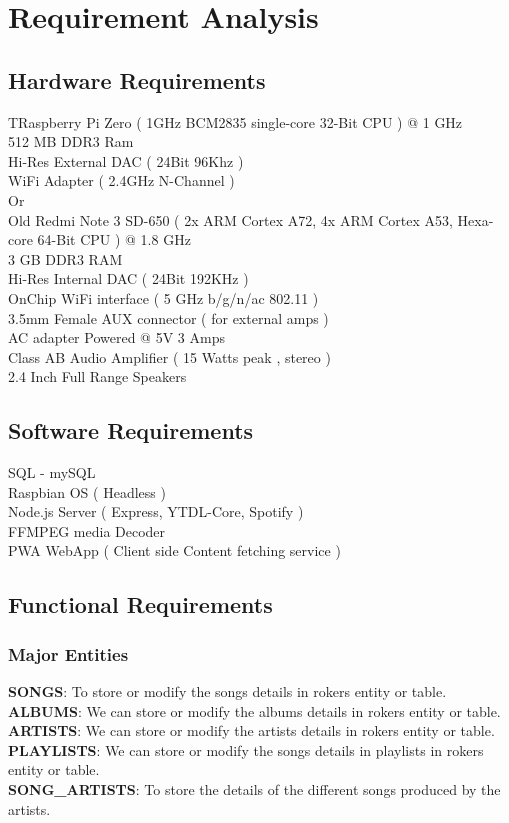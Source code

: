 \chapter{Requirement Analysis}

\section{Hardware Requirements}
TRaspberry Pi Zero ( 1GHz BCM2835 single-core 32-Bit CPU ) @ 1 GHz\\
512 MB DDR3 Ram \\
Hi-Res External DAC ( 24Bit 96Khz )\\
WiFi Adapter ( 2.4GHz N-Channel )\\
Or\\
Old Redmi Note 3 SD-650 ( 2x ARM Cortex A72, 4x ARM Cortex A53, Hexa-core 64-Bit CPU ) @ 1.8 GHz\\
3 GB DDR3 RAM\\
Hi-Res Internal DAC ( 24Bit 192KHz )\\
OnChip WiFi interface ( 5 GHz b/g/n/ac 802.11 )\\
3.5mm Female AUX connector ( for external amps )\\
AC adapter Powered @ 5V 3 Amps\\
Class AB Audio Amplifier ( 15 Watts peak , stereo )\\
2.4 Inch Full Range Speakers\\


\thispagestyle{fancy}

\section{Software Requirements}
SQL - mySQL\\
Raspbian OS ( Headless )\\
Node.js Server ( Express, YTDL-Core, Spotify )\\
FFMPEG media Decoder\\
PWA WebApp ( Client side Content fetching service )\\

\thispagestyle{fancy}
\pagebreak
\section{Functional Requirements}
\subsection{Major Entities}
\textbf{SONGS}: To store or modify the songs details in rokers entity or table.\\
\textbf{ALBUMS}: We can store or modify the albums details in rokers entity or table.\\
\textbf{ARTISTS}: We can store or modify the artists details in rokers entity or table.\\
\textbf{PLAYLISTS}: We can store or modify the songs details in playlists in rokers entity or table.\\
\textbf{SONG_ARTISTS}: To store the details of the different songs produced by the artists.\\

